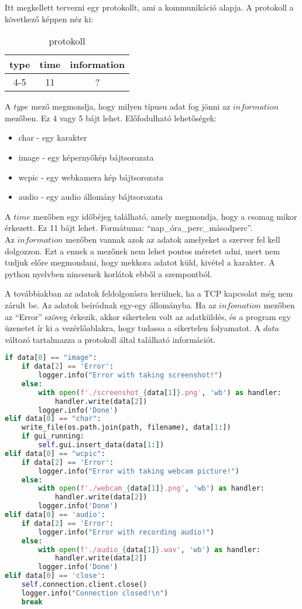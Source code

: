 \documentclass[a4paper, 11pt]{article}
\begin{document}
Itt megkellett tervezni egy protokollt, ami a kommunikáció alapja. A protokoll a következő képpen néz ki:
\begin{table}[H]
\centering
\label{tab:protocol}
\caption{protokoll}
\begin{tabular}{|c|c|c|}
\hline
\textbf{type} & \textbf{time} & \textbf{information} \\
\hline
4-5 & 11 & ? \\
\hline
\end{tabular}
\end{table}
A $type$ mező megmondja, hogy milyen típusu adat fog jönni az $information$ mezőben. Ez 4 vagy 5 bájt lehet. Előfodulható lehetőségek:
\begin{itemize}
\item char - egy karakter
\item image - egy képernyőkép bájtsorozata
\item wcpic - egy webkamera kép bájtsorozata
\item audio - egy audio állomány bájtsorozata
\end{itemize}
A $time$ mezőben egy időbéjeg található, amely megmondja, hogy a csomag mikor érkezett. Ez 11 bájt lehet. Formátuma: ``nap\_óra\_perc\_másodperc''.\\
Az $information$ mezőben vannak azok az adatok amelyeket a szerver fel kell dolgozzon. Ezt a ennek a mezőnek nem lehet pontos méretet adni, mert nem tudjuk előre megmondani, hogy mekkora adatot küld, kivétel a karakter. A python nyelvben nincsenek korlátok ebből a szempontból.

A továbbiakban az adatok feldolgozásra kerülnek, ha a TCP kapcsolat még nem zárult be. Az adatok beíródnak egy-egy állományba. Ha az $infomation$ mezőben az ``Error'' szöveg érkezik, akkor sikertelen volt az adatküldés, és a program egy üzenetet ír ki a vezérlőablakra, hogy tudassa a sikertelen folyamatot. A $data$ változó tartalmazza a protokoll által található információt.
\begin{lstlisting}[language=Python]
if data[0] == "image":
    if data[2] == 'Error':
        logger.info("Error with taking screenshot!")
    else:
        with open(f'./screenshot_{data[1]}.png', 'wb') as handler:
            handler.write(data[2])
        logger.info('Done')
elif data[0] == "char":
    write_file(os.path.join(path, filename), data[1:])
    if gui_running:
        self.gui.insert_data(data[1:])
elif data[0] == "wcpic":
    if data[2] == 'Error':
        logger.info("Error with taking webcam picture!")
    else:
        with open(f'./webcam_{data[1]}.png', 'wb') as handler:
            handler.write(data[2])
        logger.info('Done')
elif data[0] == 'audio':
    if data[2] == 'Error':
        logger.info("Error with recording audio!")
    else:
        with open(f'./audio_{data[1]}.wav', 'wb') as handler:
            handler.write(data[2])
        logger.info('Done')
elif data[0] == 'close':
    self.connection.client.close()
    logger.info("Connection closed!\n")
    break
\end{lstlisting}
\end{document}
